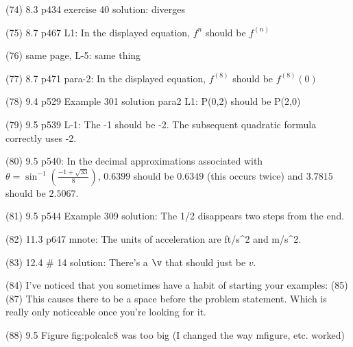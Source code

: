 {(74)  8.3 p434 exercise 40 solution: diverges

(75)  8.7 p467 L1: In the displayed equation, $f^n$ should be $f^{(n)}$

(76)  same page, L-5: same thing

(77)  8.7 p471 para-2: In the displayed equation, $f^{(8)}$ should be $f^{(8)}(0)$

(78)  9.4 p529 Example 301 solution para2 L1: P(0,2) should be P(2,0)

(79)  9.5 p539 L-1: The -1 should be -2.  The subsequent quadratic formula correctly uses -2.

(80)  9.5 p540: In the decimal approximations associated with $\theta = \sin^{-1} (\frac{-1+\sqrt {33}}{8})$, $0.6399$ should be $0.6349$ (this occurs twice) and $3.7815$ should be $2.5067$.

(81)  9.5 p544 Example 309 solution: The 1/2 disappears two steps from the end.

(82)  11.3 p647 mnote: The units of acceleration are ft/s^2 and m/s^2.
 
(83)  12.4 # 14 solution: There's a $\v$ that should just be $v$.

(84)  I've noticed that you sometimes have a habit of starting your examples:
(85)  
(87)  This causes there to be a space before the problem statement.  Which is really only noticeable once you're looking for it.
%

(88)  9.5 Figure fig:polcalc8 was too big (I changed the way mfigure, etc. worked)

}
